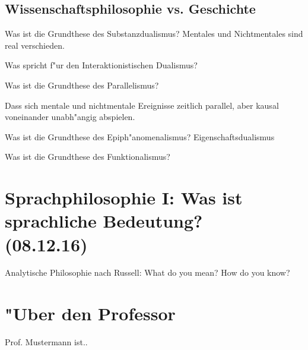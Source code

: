 \documentclass[emulatestandardclasses]{scrartcl}
\begin{document}
\subsection{Wissenschaftsphilosophie vs. Geschichte}

Was ist die Grundthese des Substanzdualismus?
Mentales und Nichtmentales sind real verschieden.

Was spricht f"ur den Interaktionistischen Dualismus?

Was ist die Grundthese des Parallelismus?

Dass sich mentale und nichtmentale Ereignisse zeitlich parallel, aber kausal voneinander unabh"angig abspielen.

Was ist die Grundthese des Epiph"anomenalismus?
Eigenschaftsdualismus


Was ist die Grundthese des Funktionalismus?



\section{Sprachphilosophie I: Was ist sprachliche Bedeutung?\\(08.12.16)}

Analytische Philosophie nach Russell: What do you mean? How do you know?

\newpage
\section{"Uber den Professor}
Prof. Mustermann ist..


\end{document}
